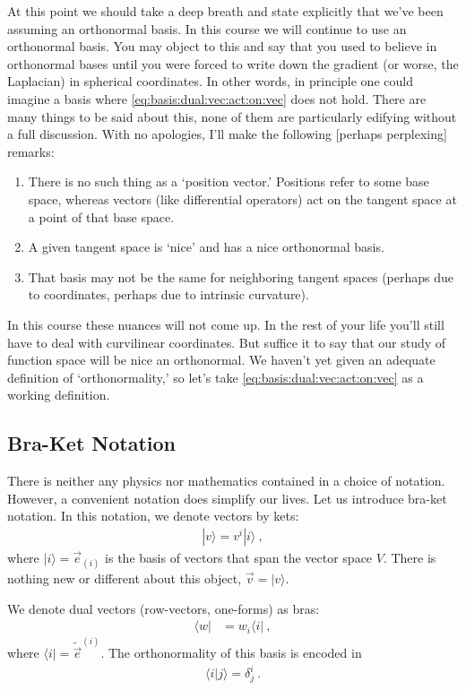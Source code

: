 At this point we should take a deep breath and state explicitly that we’ve been assuming an orthonormal basis. In this course we will continue to use an orthonormal basis. You may object to this and say that you used to believe in orthonormal bases until you were forced to write down the gradient (or worse, the Laplacian) in spherical coordinates. 
%
In other words, in principle one could imagine a basis where \eqref{eq:basis:dual:vec:act:on:vec} does not hold.
%
There are many things to be said about this, none of them are particularly edifying without a full discussion. With no apologies, I’ll make the following [perhaps perplexing] remarks:
\begin{enumerate}
\item There is no such thing as a `position vector.' Positions refer to some base space, whereas vectors (like differential operators) act on the tangent space at a point of that base space. 
\item A given tangent space is `nice’ and has a nice orthonormal basis. 
\item That basis may not be the same for neighboring tangent spaces (perhaps due to coordinates, perhaps due to intrinsic curvature). 
\end{enumerate}
In this course these nuances will not come up. In the rest of your life you’ll still have to deal with curvilinear coordinates. But suffice it to say that our study of function space will be nice an orthonormal. We haven’t yet given an adequate definition of `orthonormality,’ so let's take \eqref{eq:basis:dual:vec:act:on:vec} as a working definition.

\subsection{Bra-Ket Notation}

There is neither any physics nor mathematics contained in a choice of notation. However, a convenient notation does simplify our lives. Let us introduce bra-ket notation. In this notation, we denote vectors by kets:
\begin{align}
  |v\rangle = v^i|i\rangle \ ,
\end{align}
where $|i\rangle = \vec{e}_{(i)}$ is the basis of vectors that span the vector space $V$. There is nothing new or different about this object,  $\vec{v} = |v \rangle$.

We denote dual vectors (row-vectors, one-forms) as bras:
\begin{align}
  \langle w | &= w_i \langle i| \ ,
\end{align}
where $\langle i | = \tilde{\vec{e}}^{(i)}$. The orthonormality of this basis is encoded in 
\begin{align}
  \langle i | j \rangle = \delta^i_j \ .
\end{align}

